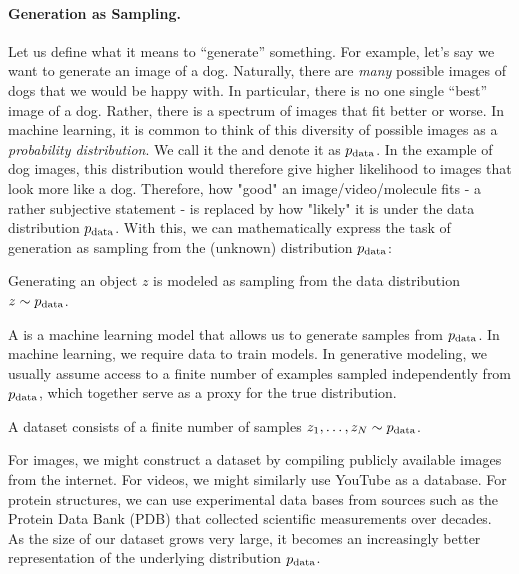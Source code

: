 \paragraph{Generation as Sampling.}Let us define what it means to ``generate'' something. For example, let's say we want to generate an image of a dog. Naturally, there are \emph{many} possible images of dogs that we would be happy with. In particular, there is no one single ``best'' image of a dog. Rather, there is a spectrum of images that fit better or worse. In machine learning, it is common to think of this diversity of possible images as a \emph{probability distribution}. We call it the  and denote it as $p_{\rm{data}}$. In the example of dog images, this distribution would therefore give higher likelihood to images that look more like a dog. Therefore, how "good" an image/video/molecule fits - a rather subjective statement - is replaced by how "likely" it is under the data distribution $p_{\rm{data}}$. With this, we can mathematically express the task of generation as sampling from the (unknown) distribution $p_{\rm{data}}$:
\begin{ideabox}
    Generating an object $z$ is modeled as sampling from the data distribution $z\sim p_{\rm{data}}$.
\end{ideabox}
A  is a machine learning model that allows us to generate samples from $p_{\rm{data}}$. In machine learning, we require data to train models. In generative modeling, we usually assume access to a finite number of examples sampled independently from $p_{\rm{data}}$, which together serve as a proxy for the true distribution.
\begin{ideabox}[Dataset]
    A dataset consists of a finite number of samples $z_1, \dots, z_N \sim p_{\rm{data}}$.
\end{ideabox}
For images, we might construct a dataset by compiling publicly available images from the internet. For videos, we might similarly use YouTube as a database. For protein structures, we can use experimental data bases from sources such as the Protein Data Bank (PDB) that collected scientific measurements over decades. As the size of our dataset grows very large, it becomes an increasingly better representation of the underlying distribution $p_{\rm{data}}$.

